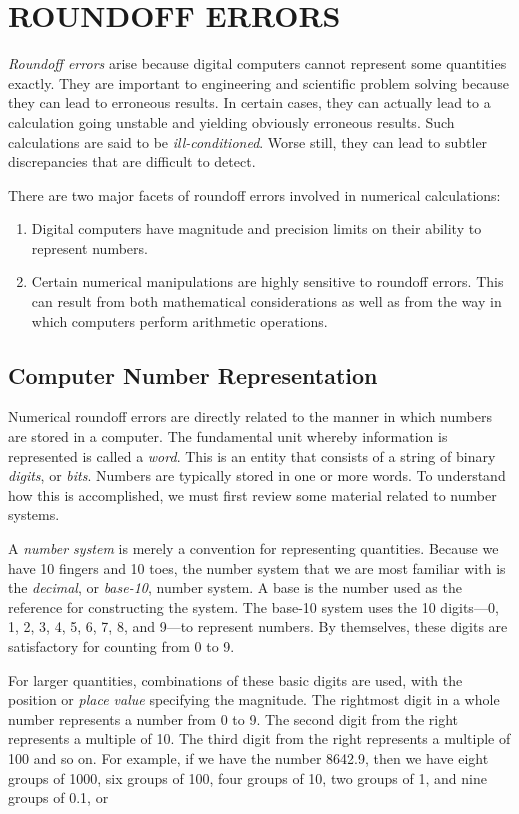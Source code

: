\documentclass[../main.tex]{subfiles}
\begin{document}
\section{ROUNDOFF ERRORS}
\emph{Roundoff errors} arise because digital computers cannot represent some quantities exactly.
They are important to engineering and scientific problem solving because they
can lead to erroneous results. In certain cases, they can actually lead to a calculation
going unstable and yielding obviously erroneous results. Such calculations are said to
be \emph{ill-conditioned}. Worse still, they can lead to subtler discrepancies that are difficult
to detect.

There are two major facets of roundoff errors involved in numerical calculations:

\begin{enumerate}
    \item Digital computers have magnitude and precision limits on their ability to represent
    numbers.
    \item Certain numerical manipulations are highly sensitive to roundoff errors. This can result
    from both mathematical considerations as well as from the way in which computers
    perform arithmetic operations.
\end{enumerate}

\subsection{Computer Number Representation}
Numerical roundoff errors are directly related to the manner in which numbers are stored
in a computer. The fundamental unit whereby information is represented is called a \emph{word}.
This is an entity that consists of a string of binary \emph{digits}, or \emph{bits}. Numbers are typically
stored in one or more words. To understand how this is accomplished, we must first review
some material related to number systems.

A \emph{number system} is merely a convention for representing quantities. Because we have
10 fingers and 10 toes, the number system that we are most familiar with is the \emph{decimal}, or
\emph{base-10}, number system. A base is the number used as the reference for constructing the
system. The base-10 system uses the 10 digits---0, 1, 2, 3, 4, 5, 6, 7, 8, and 9---to represent
numbers. By themselves, these digits are satisfactory for counting from 0 to 9.

For larger quantities, combinations of these basic digits are used, with the position or
\emph{place value} specifying the magnitude. The rightmost digit in a whole number represents a
number from 0 to 9. The second digit from the right represents a multiple of 10. The third
digit from the right represents a multiple of 100 and so on. For example, if we have the
number 8642.9, then we have eight groups of 1000, six groups of 100, four groups of 10,
two groups of 1, and nine groups of 0.1, or\\
\end{document}
